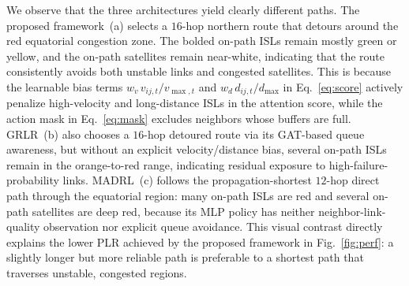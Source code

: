 We observe that the three architectures yield clearly different paths. The proposed framework~(a) selects a $16$-hop northern route that detours around the red equatorial congestion zone. The bolded on-path ISLs remain mostly green or yellow, and the on-path satellites remain near-white, indicating that the route consistently avoids both unstable links and congested satellites. This is because the learnable bias terms $w_v\,v_{ij,t}/v_{\max,t}$ and $w_d\,d_{ij,t}/d_{\max}$ in Eq.~\eqref{eq:score} actively penalize high-velocity and long-distance ISLs in the attention score, while the action mask in Eq.~\eqref{eq:mask} excludes neighbors whose buffers are full. GRLR~(b) also chooses a $16$-hop detoured route via its GAT-based queue awareness, but without an explicit velocity/distance bias, several on-path ISLs remain in the orange-to-red range, indicating residual exposure to high-failure-probability links. MADRL~(c) follows the propagation-shortest $12$-hop direct path through the equatorial region: many on-path ISLs are red and several on-path satellites are deep red, because its MLP policy has neither neighbor-link-quality observation nor explicit queue avoidance. This visual contrast directly explains the lower PLR achieved by the proposed framework in Fig.~\ref{fig:perf}: a slightly longer but more reliable path is preferable to a shortest path that traverses unstable, congested regions.
